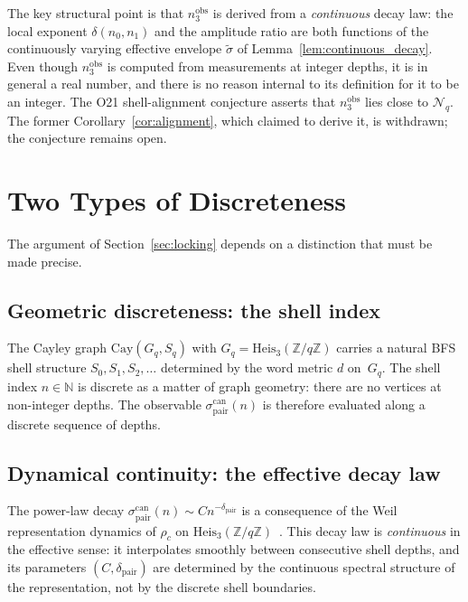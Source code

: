 \documentclass[12pt,a4paper]{article}
\theoremstyle{remark}
\newcommand{\sigpair}{\sigma^{\mathrm{can}}_{\mathrm{pair}}}
\newcommand{\nobs}{n^{\mathrm{obs}}_3}
\newcommand{\dpair}{\delta_{\mathrm{pair}}}
\newcommand{\Cay}{\mathrm{Cay}(G_q, S_q)}
\newcommand{\Heis}{\mathrm{Heis}_3(\mathbb{Z}/q\mathbb{Z})}
\begin{document}
    The key structural point is that $\nobs$ is derived from a \emph{continuous} decay
    law: the local exponent $\delta(n_0, n_1)$ and the amplitude ratio are both functions
    of the continuously varying effective envelope $\tilde{\sigma}$ of
    Lemma~\ref{lem:continuous_decay}.
    Even though $\nobs$ is computed from measurements at integer depths, it is in general
    a real number, and there is no reason internal to its definition for it to be an integer.
    The O21 shell-alignment conjecture asserts that $\nobs$ lies close to $\mathcal{N}_q$.
    The former Corollary~\ref{cor:alignment}, which claimed to derive it, is withdrawn;
    the conjecture remains open.

  \section{Two Types of Discreteness}
  \label{sec:two_discretenesses}

  The argument of Section~\ref{sec:locking} depends on a distinction that must be made precise.

  \subsection{Geometric discreteness: the shell index}
    \label{subsec:geometric_discreteness}

    The Cayley graph $\Cay$ with $G_q = \Heis$ carries a natural BFS shell
    structure $S_0, S_1, S_2, \ldots$ determined by the word metric $d$ on~$G_q$.
    The shell index $n \in \mathbb{N}$ is discrete as a matter of graph geometry: there are no
    vertices at non-integer depths.
    The observable $\sigpair(n)$ is therefore evaluated along a discrete sequence of depths.

  \subsection{Dynamical continuity: the effective decay law}
    \label{subsec:dynamical_continuity}

    The power-law decay $\sigpair(n) \sim C n^{-\dpair}$ is a consequence of the Weil
    representation dynamics of $\rho_c$ on $\Heis$~\cite{Beau2026a20,Beau2026a21}.
    This decay law is \emph{continuous} in the effective sense: it interpolates smoothly between
    consecutive shell depths, and its parameters $(C, \dpair)$ are determined by the continuous
    spectral structure of the representation, not by the discrete shell boundaries.
\end{document}

